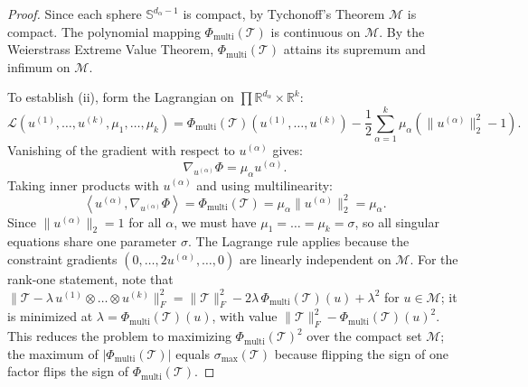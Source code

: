 \documentclass[11pt,a4paper,reqno]{amsart}
\theoremstyle{definition}
\numberwithin{equation}{section}
\newcommand{\R}{\mathbb{R}}
\newcommand{\Sph}{\mathbb{S}}
\newcommand{\inner}[2]{\left\langle #1, #2 \right\rangle}
\begin{document}
\begin{proof}
Since each sphere $\Sph^{d_\alpha - 1}$ is compact, by Tychonoff's Theorem $\mathcal{M}$ is compact. The polynomial mapping $\Phi_{\mathrm{multi}}(\mathcal{T})$ is continuous on $\mathcal{M}$. By the Weierstrass Extreme Value Theorem, $\Phi_{\mathrm{multi}}(\mathcal{T})$ attains its supremum and infimum on $\mathcal{M}$. 

To establish (ii), form the Lagrangian on $\prod \R^{d_\alpha} \times \R^k$:
\begin{equation}
    \mathcal{L}(u^{(1)}, \dots, u^{(k)}, \mu_1, \dots, \mu_k) = \Phi_{\mathrm{multi}}(\mathcal{T})(u^{(1)}, \dots, u^{(k)}) - \frac{1}{2} \sum_{\alpha=1}^k \mu_\alpha (\|u^{(\alpha)}\|_2^2 - 1).
\end{equation}
Vanishing of the gradient with respect to $u^{(\alpha)}$ gives:
\begin{equation}
    \nabla_{u^{(\alpha)}} \Phi = \mu_\alpha u^{(\alpha)}.
\end{equation}
Taking inner products with $u^{(\alpha)}$ and using multilinearity:
\begin{equation}
    \inner{u^{(\alpha)}}{\nabla_{u^{(\alpha)}} \Phi} = \Phi_{\mathrm{multi}}(\mathcal{T}) = \mu_\alpha \|u^{(\alpha)}\|_2^2 = \mu_\alpha.
\end{equation}
Since $\|u^{(\alpha)}\|_2 = 1$ for all $\alpha$, we must have $\mu_1 = \dots = \mu_k = \sigma$, so all singular equations share one parameter $\sigma$. The Lagrange rule applies because the constraint gradients $(0, \dots, 2u^{(\alpha)}, \dots, 0)$ are linearly independent on $\mathcal{M}$. For the rank-one statement, note that $\|\mathcal{T} - \lambda\, u^{(1)}\otimes\dots\otimes u^{(k)}\|_F^2 = \|\mathcal{T}\|_F^2 - 2\lambda\,\Phi_{\mathrm{multi}}(\mathcal{T})(u) + \lambda^2$ for $u \in \mathcal{M}$; it is minimized at $\lambda = \Phi_{\mathrm{multi}}(\mathcal{T})(u)$, with value $\|\mathcal{T}\|_F^2 - \Phi_{\mathrm{multi}}(\mathcal{T})(u)^2$. This reduces the problem to maximizing $\Phi_{\mathrm{multi}}(\mathcal{T})^2$ over the compact set $\mathcal{M}$; the maximum of $|\Phi_{\mathrm{multi}}(\mathcal{T})|$ equals $\sigma_{\max}(\mathcal{T})$ because flipping the sign of one factor flips the sign of $\Phi_{\mathrm{multi}}(\mathcal{T})$.
\end{proof}
\end{document}

